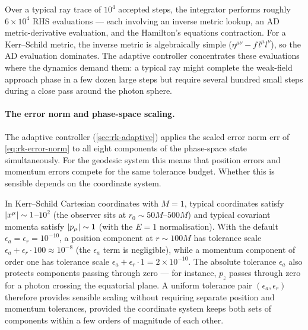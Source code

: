Over a typical ray trace of $10^4$ accepted steps, the integrator
performs roughly $6 \times 10^4$ RHS evaluations --- each involving an
inverse metric lookup, an AD metric-derivative evaluation, and the Hamilton's
equations contraction.  For a Kerr--Schild metric, the inverse metric
is algebraically simple ($\eta^{\mu\nu} - f\,l^\mu l^\nu$), so the AD
evaluation dominates.  The adaptive controller concentrates these
evaluations where the dynamics demand them: a typical ray might
complete the weak-field approach phase in a few dozen large steps
but require several hundred small steps during a close pass around
the photon sphere.

\paragraph{The error norm and phase-space scaling.}

The adaptive controller (\cref{sec:rk-adaptive}) applies the scaled
error norm $\mathrm{err}$ of \cref{eq:rk-error-norm} to all eight
components of the phase-space state simultaneously.  For the geodesic
system this means that position errors and momentum errors compete
for the same tolerance budget.  Whether this is sensible depends on
the coordinate system.

In Kerr--Schild Cartesian coordinates with $M = 1$, typical
coordinates satisfy $\left\lvert x^\mu \right\rvert \sim 1$--$10^2$ (the observer sits
at $r_0 \sim 50M$--$500M$) and typical covariant momenta satisfy
$\left\lvert p_\mu \right\rvert \sim 1$ (with the $E = 1$ normalisation).  With the
default $\epsilon_a = \epsilon_r = 10^{-10}$, a position component at
$r \sim 100M$ has tolerance scale
$\epsilon_a + \epsilon_r \cdot 100 \approx 10^{-8}$ (the $\epsilon_a$
term is negligible), while a momentum component of order one has
tolerance scale $\epsilon_a + \epsilon_r \cdot 1 = 2 \times 10^{-10}$.
The absolute tolerance $\epsilon_a$ also protects components passing
through zero --- for instance, $p_z$ passes through zero for a photon
crossing the equatorial plane.  A
uniform tolerance pair $(\epsilon_a, \epsilon_r)$ therefore provides
sensible scaling without requiring separate position and momentum
tolerances, provided the coordinate system keeps both sets of
components within a few orders of magnitude of each other.

